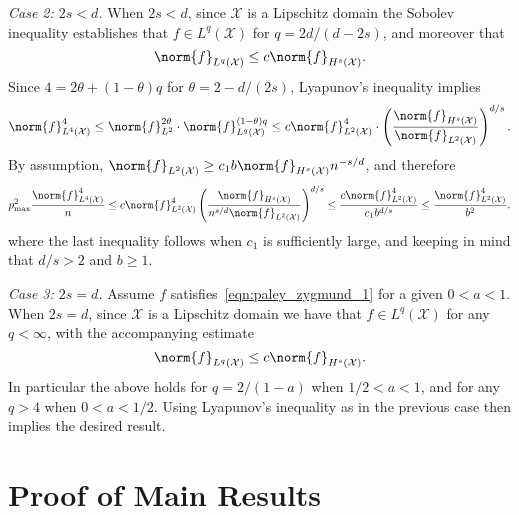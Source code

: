 \documentclass[twoside]{article}
\newcommand{\1}{\mathbf{1}}
\newcommand{\Xset}{\mathcal{X}}
\newcommand{\Leb}{L}
\theoremstyle{definition}
\theoremstyle{remark}
\begin{document}
\textit{Case 2: $2s < d$.}
When $2s < d$, since $\Xset$ is a Lipschitz domain the Sobolev inequality establishes that $f \in \Leb^q(\Xset)$ for $q = 2d/(d - 2s)$, and moreover that
\begin{equation*}
\norm{f}_{\Leb^q(\Xset)} \leq c \norm{f}_{H^s(\Xset)}.
\end{equation*}
Since $4 = 2\theta + (1 - \theta)q$ for $\theta = 2 - d/(2s)$, Lyapunov's inequality implies
\begin{equation*}
\norm{f}_{\Leb^4(\Xset)}^4 \leq \norm{f}_{\Leb^2}^{2\theta} \cdot \norm{f}_{\Leb^q(\Xset)}^{(1 - \theta)q} \leq c \norm{f}_{\Leb^2(\Xset)}^{4} \cdot \left(\frac{\norm{f}_{H^s(\Xset)}}{\norm{f}_{\Leb^2(\Xset)}}\right)^{d/s}.
\end{equation*}
By assumption, $\norm{f}_{\Leb^2(\Xset)} \geq c_1 b \norm{f}_{H^s(\Xset)} n^{-s/d}$, and therefore
\begin{equation*}
p_{\max}^2 \frac{\norm{f}_{\Leb^4(\Xset)}^4}{n} \leq c\norm{f}_{\Leb^2(\Xset)}^4 \left(\frac{\norm{f}_{H^s(\Xset)}}{n^{s/d}\norm{f}_{\Leb^2(\Xset)}}\right)^{d/s} \leq \frac{c\norm{f}_{\Leb^2(\Xset)}^4}{c_1b^{d/s}} \leq \frac{\norm{f}_{\Leb^2(\Xset)}^4}{b^2}.
\end{equation*}
where the last inequality follows when $c_1$ is sufficiently large, and keeping in mind that $d/s > 2$ and $b \geq 1$. 

\textit{Case 3: $2s = d$.}
Assume $f$ satisfies~\eqref{eqn:paley_zygmund_1} for a given $0 < a < 1$. When $2s = d$, since $\Xset$ is a Lipschitz domain we have that $f \in L^q(\Xset)$ for any $q < \infty$, with the accompanying estimate
\begin{equation*}
\norm{f}_{\Leb^q(\Xset)} \leq c \norm{f}_{H^s(\Xset)}.
\end{equation*}
In particular the above holds for $q = 2/(1 - a)$ when $1/2 < a < 1$, and for any $q > 4$ when $0 < a < 1/2$. Using Lyapunov's inequality as in the previous case then implies the desired result.

\section{Proof of Main Results}
\label{sec:main_results}
\end{document}
